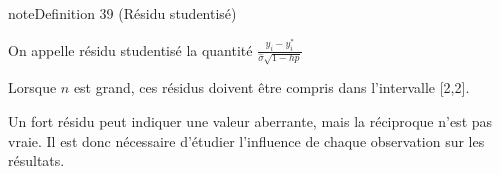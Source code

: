 \documentclass[letterpaper,10pt,english]{jupyterBook}
\begin{document}
\ignorespaces \label{regression:definition-8}
\begin{sphinxadmonition}{note}{Definition 39 (Résidu studentisé)}



\sphinxAtStartPar
On appelle résidu studentisé la quantité \(\frac{y_i-y^*_i}{\hat{\sigma}\sqrt{1-hp}}\)
\end{sphinxadmonition}

\sphinxAtStartPar
Lorsque \(n\) est grand, ces résidus doivent être compris dans l’intervalle {[}\sphinxhyphen{}2,2{]}.

\sphinxAtStartPar
Un fort résidu peut indiquer une valeur aberrante, mais la réciproque n’est pas vraie. Il est donc nécessaire d’étudier l’influence de chaque observation sur les résultats.
\end{document}
